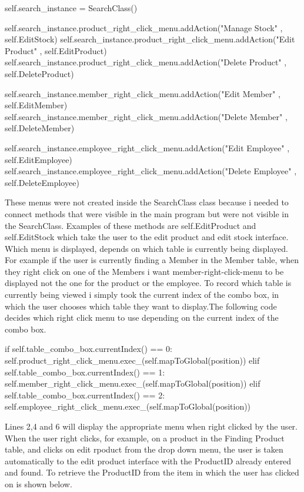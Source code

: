 \begin{python}

self.search_instance = SearchClass()
        
self.search_instance.product_right_click_menu.addAction("Manage Stock" , self.EditStock)
self.search_instance.product_right_click_menu.addAction("Edit Product" , self.EditProduct)
self.search_instance.product_right_click_menu.addAction("Delete Product" , self.DeleteProduct)

self.search_instance.member_right_click_menu.addAction("Edit Member" , self.EditMember)
self.search_instance.member_right_click_menu.addAction("Delete Member" , self.DeleteMember)

self.search_instance.employee_right_click_menu.addAction("Edit Employee" , self.EditEmployee)
self.search_instance.employee_right_click_menu.addAction("Delete Employee" , self.DeleteEmployee)

\end{python}

These menus were not created inside the SearchClass class because i needed to connect methods that were visible in the main program but were not visible in the SearchClass. Examples of these methods are self.EditProduct and self.EditStock which take the user to the edit product and edit stock interface. Which menu is displayed, depends on which table is currently being displayed. For example if the user is currently finding a Member in the Member table, when they right click on one of the Members i want member-right-click-menu to be displayed not the one for the product or the employee. To record which table is currently being viewed i simply took the current index of the combo box, in which the user chooses which table they want to display.The following code decides which right click menu to use depending on the current index of the combo box.

\begin{python}
 if self.table_combo_box.currentIndex() == 0:
	 self.product_right_click_menu.exec_(self.mapToGlobal(position))
 elif self.table_combo_box.currentIndex() == 1:
	self.member_right_click_menu.exec_(self.mapToGlobal(position))
elif self.table_combo_box.currentIndex() == 2:
	self.employee_right_click_menu.exec_(self.mapToGlobal(position))
\end{python}

Lines 2,4 and 6 will display the appropriate menu when right clicked by the user. When the user right clicks, for example, on a product in the Finding Product table, and clicks on edit rpoduct from the drop down menu, the user is taken automatically to the edit product interface with the ProductID already entered and found. To retrieve the ProductID from the item in which the user has clicked on is shown below.

